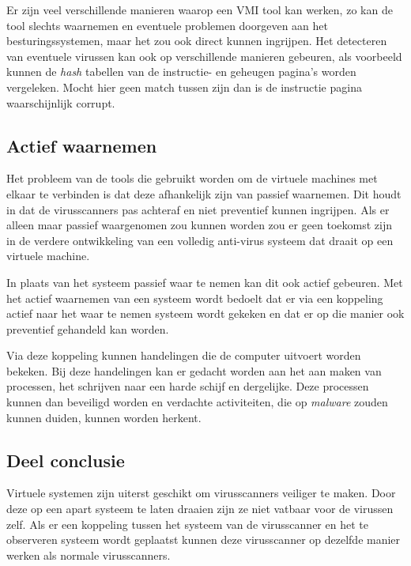 \documentclass[12pt]{uva-inf-article}
\begin{document}
Er zijn veel verschillende manieren waarop een VMI tool kan werken, zo kan de
tool slechts waarnemen en eventuele problemen doorgeven aan het besturingssystemen,
maar het zou ook direct kunnen ingrijpen.
Het detecteren van eventuele virussen kan ook op verschillende manieren gebeuren,
als voorbeeld kunnen de \textit{hash} tabellen van de instructie- en geheugen pagina's
worden vergeleken. Mocht hier geen match tussen zijn dan is de instructie pagina
waarschijnlijk corrupt.
\cite{nance2008virtual}

\subsection{Actief waarnemen}
Het probleem van de tools die gebruikt worden om de virtuele machines met elkaar
te verbinden is dat deze afhankelijk zijn van passief waarnemen. Dit houdt in
dat de virusscanners pas achteraf en niet preventief kunnen ingrijpen. Als er
alleen maar passief waargenomen zou kunnen worden zou er geen toekomst zijn in de verdere
ontwikkeling van een volledig anti-virus systeem dat draait op een virtuele machine.

In plaats van het systeem passief waar te nemen kan dit ook actief gebeuren.
Met het actief waarnemen van een systeem wordt bedoelt dat er via een koppeling
actief naar het waar te nemen systeem wordt gekeken en dat er op die manier ook
preventief gehandeld kan worden.

Via deze koppeling kunnen handelingen die de computer uitvoert worden bekeken.
Bij deze handelingen kan er gedacht worden aan het aan maken van processen, het
schrijven naar een harde schijf en dergelijke. Deze processen kunnen dan beveiligd
worden en verdachte activiteiten, die op \textit{malware} zouden kunnen duiden,
kunnen worden herkent. \cite{payne2008lares}

\subsection{Deel conclusie}
Virtuele systemen zijn uiterst geschikt om virusscanners veiliger te maken. Door
deze op een apart systeem te laten draaien zijn ze niet vatbaar voor de virussen
zelf. Als er een koppeling tussen het systeem van de virusscanner en het te observeren
systeem wordt geplaatst kunnen deze virusscanner op dezelfde manier werken als
normale virusscanners.


\end{document}
